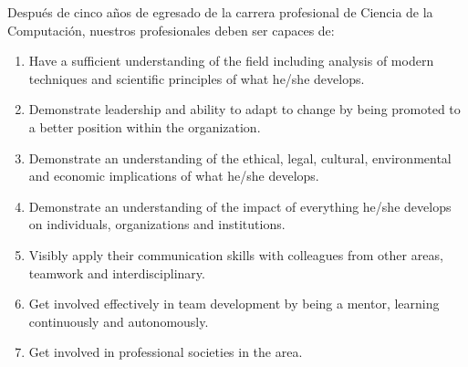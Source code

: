 Después de cinco años de egresado de la carrera profesional de Ciencia de la Computación, nuestros profesionales deben ser capaces de:
\begin{enumerate}
\item Have a sufficient understanding of the field including analysis of modern techniques and scientific principles of what he/she develops.
\item Demonstrate leadership and ability to adapt to change by being promoted to a better position within the organization.
\item Demonstrate an understanding of the ethical, legal, cultural, environmental and economic implications of what he/she develops.
\item Demonstrate an understanding of the impact of everything he/she develops on individuals, organizations and institutions.
\item Visibly apply their communication skills with colleagues from other areas, teamwork and interdisciplinary.
\item Get involved effectively in team development by being a mentor, learning continuously and autonomously.
\item Get involved in professional societies in the area.
\end{enumerate}